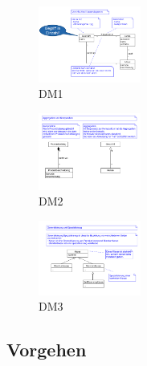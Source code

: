 \documentclass{article}
\begin{document}
\begin{multicols}{3}
\begin{figure}[H]
	\centering
	\includegraphics[width=0.3\textwidth] {Resources/Images/DM1.png}
	\caption{\label{fig:DM1}DM1}
	\end{figure}


\columnbreak
\begin{figure}[H]
	\centering
	\includegraphics[width=0.3\textwidth] {Resources/Images/DM2.png}
	\caption{\label{fig:DM2}DM2}
	\end{figure}
\columnbreak
\begin{figure}[H]
	\centering
	\includegraphics[width=0.3\textwidth] {Resources/Images/DM3.png}
	\caption{\label{fig:DM3}DM3}
	\end{figure}
\end{multicols}


\subsection{Vorgehen}
\end{document}
